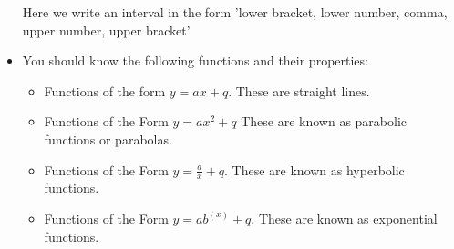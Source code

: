 \begin{itemize}[noitemsep]
Here we write an interval in the form 'lower bracket, lower number, comma, upper number, upper bracket'\item  You should know the following functions and their properties:\label{m39348*id679348}\begin{itemize}[noitemsep]
\item 
Functions of the form $y=ax+q$. These are straight lines.\item 
Functions of the Form $y=a{x}^{2}+q$ These are known as parabolic functions or parabolas.\item 
Functions of the Form $y=\frac{a}{x}+q$. These are known as hyperbolic functions.\item 
Functions of the Form $y=a{b}^{\left(x\right)}+q$. These are known as exponential functions.\end{itemize}
\end{itemize}
\label{m39348*cid7}
